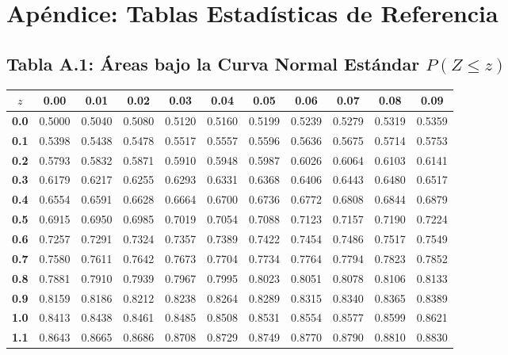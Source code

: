 \chapter*{Apéndice: Tablas Estadísticas de Referencia}
\label{apendice:tablas}

\section*{Tabla A.1: Áreas bajo la Curva Normal Estándar $P(Z \le z)$}

\begin{center}
\small
\begin{tabular}{c|cccccccccc}
\toprule
$z$ & \textbf{0.00} & \textbf{0.01} & \textbf{0.02} & \textbf{0.03} & \textbf{0.04} & \textbf{0.05} & \textbf{0.06} & \textbf{0.07} & \textbf{0.08} & \textbf{0.09} \\
\midrule
\textbf{0.0} & 0.5000 & 0.5040 & 0.5080 & 0.5120 & 0.5160 & 0.5199 & 0.5239 & 0.5279 & 0.5319 & 0.5359 \\
\textbf{0.1} & 0.5398 & 0.5438 & 0.5478 & 0.5517 & 0.5557 & 0.5596 & 0.5636 & 0.5675 & 0.5714 & 0.5753 \\
\textbf{0.2} & 0.5793 & 0.5832 & 0.5871 & 0.5910 & 0.5948 & 0.5987 & 0.6026 & 0.6064 & 0.6103 & 0.6141 \\
\textbf{0.3} & 0.6179 & 0.6217 & 0.6255 & 0.6293 & 0.6331 & 0.6368 & 0.6406 & 0.6443 & 0.6480 & 0.6517 \\
\textbf{0.4} & 0.6554 & 0.6591 & 0.6628 & 0.6664 & 0.6700 & 0.6736 & 0.6772 & 0.6808 & 0.6844 & 0.6879 \\
\textbf{0.5} & 0.6915 & 0.6950 & 0.6985 & 0.7019 & 0.7054 & 0.7088 & 0.7123 & 0.7157 & 0.7190 & 0.7224 \\
\textbf{0.6} & 0.7257 & 0.7291 & 0.7324 & 0.7357 & 0.7389 & 0.7422 & 0.7454 & 0.7486 & 0.7517 & 0.7549 \\
\textbf{0.7} & 0.7580 & 0.7611 & 0.7642 & 0.7673 & 0.7704 & 0.7734 & 0.7764 & 0.7794 & 0.7823 & 0.7852 \\
\textbf{0.8} & 0.7881 & 0.7910 & 0.7939 & 0.7967 & 0.7995 & 0.8023 & 0.8051 & 0.8078 & 0.8106 & 0.8133 \\
\textbf{0.9} & 0.8159 & 0.8186 & 0.8212 & 0.8238 & 0.8264 & 0.8289 & 0.8315 & 0.8340 & 0.8365 & 0.8389 \\
\textbf{1.0} & 0.8413 & 0.8438 & 0.8461 & 0.8485 & 0.8508 & 0.8531 & 0.8554 & 0.8577 & 0.8599 & 0.8621 \\
\textbf{1.1} & 0.8643 & 0.8665 & 0.8686 & 0.8708 & 0.8729 & 0.8749 & 0.8770 & 0.8790 & 0.8810 & 0.8830 \\

\end{tabular}
\end{center}
